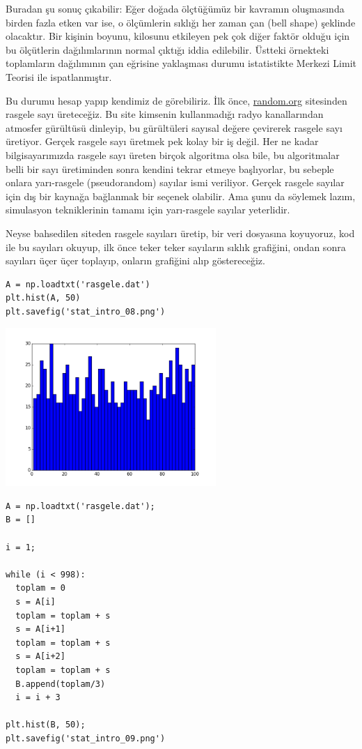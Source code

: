 \documentclass[12pt,fleqn]{article}\usepackage{../../common}
\begin{document}
Buradan şu sonuç çıkabilir: Eğer doğada ölçtüğümüz bir kavramın oluşmasında
birden fazla etken var ise, o ölçümlerin sıklığı her zaman çan (bell shape)
şeklinde olacaktır. Bir kişinin boyunu, kilosunu etkileyen pek çok diğer faktör
olduğu için bu ölçütlerin dağılımlarının normal çıktığı iddia
edilebilir. Üstteki örnekteki toplamların dağılımının çan eğrisine yaklaşması
durumu istatistikte Merkezi Limit Teorisi ile ispatlanmıştır.

Bu durumu hesap yapıp kendimiz de görebiliriz. İlk önce, \url{random.org}
sitesinden rasgele sayı üreteceğiz. Bu site kimsenin kullanmadığı radyo
kanallarından atmosfer gürültüsü dinleyip, bu gürültüleri sayısal değere
çevirerek rasgele sayı üretiyor. Gerçek rasgele sayı üretmek pek kolay bir iş
değil. Her ne kadar bilgisayarımızda rasgele sayı üreten birçok algoritma olsa
bile, bu algoritmalar belli bir sayı üretiminden sonra kendini tekrar etmeye
başlıyorlar, bu sebeple onlara yarı-rasgele (pseudorandom) sayılar ismi
veriliyor. Gerçek rasgele sayılar için dış bir kaynağa bağlanmak bir seçenek
olabilir. Ama şunu da söylemek lazım, simulasyon tekniklerinin tamamı için
yarı-rasgele sayılar yeterlidir.

Neyse bahsedilen siteden rasgele sayıları üretip, bir veri dosyasına koyuyoruz,
kod ile bu sayıları okuyup, ilk önce teker teker sayıların sıklık grafiğini,
ondan sonra sayıları üçer üçer toplayıp, onların grafiğini alıp göstereceğiz.

\begin{verbatim}
A = np.loadtxt('rasgele.dat')
plt.hist(A, 50)
plt.savefig('stat_intro_08.png')
\end{verbatim}

\includegraphics[height=6cm]{stat_intro_08.png}

\begin{verbatim}
A = np.loadtxt('rasgele.dat');
B = []

i = 1;

while (i < 998):
  toplam = 0
  s = A[i]
  toplam = toplam + s
  s = A[i+1]
  toplam = toplam + s
  s = A[i+2]
  toplam = toplam + s
  B.append(toplam/3)
  i = i + 3

plt.hist(B, 50);
plt.savefig('stat_intro_09.png')
\end{verbatim}
\end{document}
